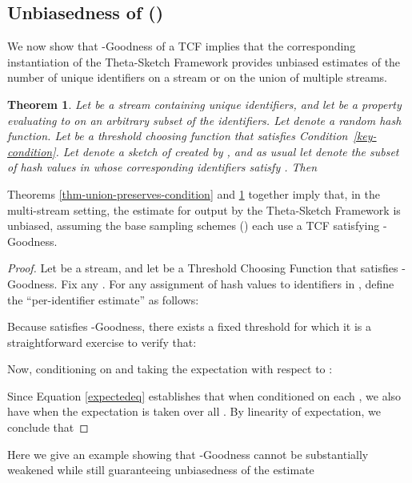 \documentclass{article}
\newtheorem{theorem}{Theorem}[section]
\begin{document}
\subsection{Unbiasedness of ()}\label{sec:subpop-unbiased}
We now show that -Goodness of a TCF implies that the corresponding instantiation 
of the Theta-Sketch Framework provides unbiased estimates of the number of unique identifiers
on a stream or on the union of multiple streams.
\begin{theorem}\label{thm-key-property-implies-unbiased-for-single-streams} \label{thm:unbiased}
Let  be a stream containing  unique identifiers, and let  be a property evaluating to  on an arbitrary subset of the identifiers.
Let  denote a random hash function.
Let  be a threshold choosing function that satisfies Condition~\ref{key-condition}. 
Let  denote a sketch of  created by ,
and as usual let  denote the subset of hash values in  whose corresponding identifiers satisfy .
Then 
\end{theorem}


\noindent Theorems \ref{thm-union-preserves-condition} and \ref{thm-key-property-implies-unbiased-for-single-streams}  together
imply that, in the multi-stream setting, the estimate  for  output by the Theta-Sketch Framework is unbiased,
assuming the base sampling schemes () each use a TCF  satisfying -Goodness.

\begin{proof}
Let  be a stream, and let  be a Threshold Choosing Function that satisfies -Goodness. Fix any . For any assignment  of hash values to identifiers in ,
define the ``per-identifier estimate''  as follows:



\noindent Because  satisfies -Goodness, there exists a fixed threshold  for which it is
a straightforward exercise to verify that:



\noindent Now, conditioning on  and taking the expectation with respect to :



\noindent Since Equation \eqref{expectedeq} establishes that  when conditioned on each , we also have
 when the expectation is taken over all .
By linearity of expectation, we conclude that

\end{proof}


\label{section:negative-example}
Here we give an example showing
that -Goodness cannot be substantially weakened while still guaranteeing unbiasedness of the estimate 
 
\end{document}
